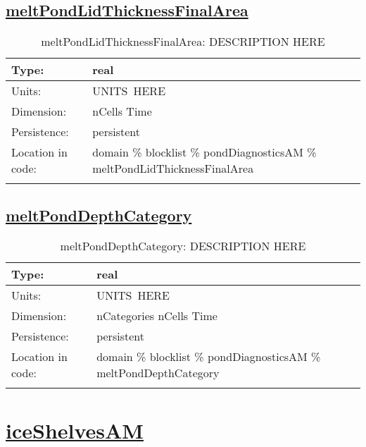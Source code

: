 \subsection[meltPondLidThicknessFinalArea]{\hyperref[sec:var_tab_pondDiagnosticsAM]{meltPondLidThicknessFinalArea}}
\label{subsec:var_sec_pondDiagnosticsAM_meltPondLidThicknessFinalArea}
\begin{center}
\begin{longtable}{| p{2.0in} | p{4.0in} |}
        \hline 
        Type: & real \\
        \hline 
        Units: & \si{UNITS.HERE} \\
        \hline 
        Dimension: & nCells Time \\
        \hline 
        Persistence: & persistent \\
        \hline 
         Location in code: & domain \% blocklist \% pondDiagnosticsAM \% meltPondLidThicknessFinalArea \\
         \hline 
    \caption{meltPondLidThicknessFinalArea: DESCRIPTION HERE}
\end{longtable}
\end{center}
\subsection[meltPondDepthCategory]{\hyperref[sec:var_tab_pondDiagnosticsAM]{meltPondDepthCategory}}
\label{subsec:var_sec_pondDiagnosticsAM_meltPondDepthCategory}
\begin{center}
\begin{longtable}{| p{2.0in} | p{4.0in} |}
        \hline 
        Type: & real \\
        \hline 
        Units: & \si{UNITS.HERE} \\
        \hline 
        Dimension: & nCategories nCells Time \\
        \hline 
        Persistence: & persistent \\
        \hline 
         Location in code: & domain \% blocklist \% pondDiagnosticsAM \% meltPondDepthCategory \\
         \hline 
    \caption{meltPondDepthCategory: DESCRIPTION HERE}
\end{longtable}
\end{center}
\section[iceShelvesAM]{\hyperref[sec:var_tab_iceShelvesAM]{iceShelvesAM}}
\label{sec:var_sec_iceShelvesAM}
